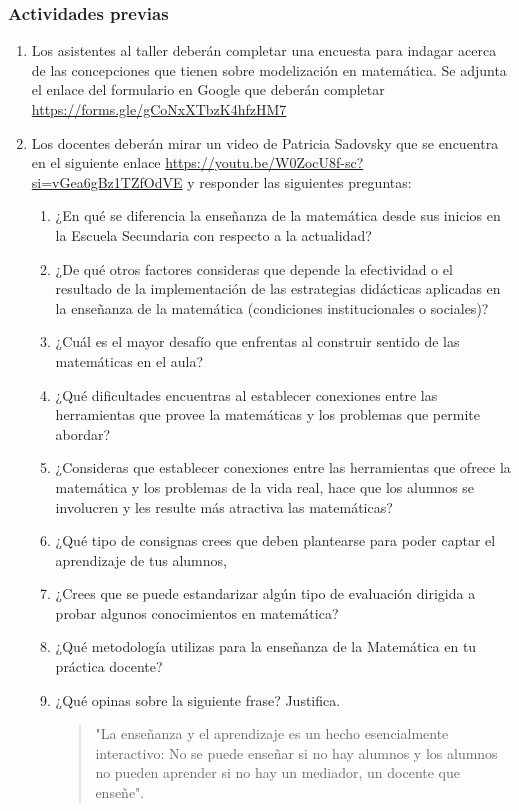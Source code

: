 \subsubsection{Actividades previas}
\begin{enumerate}
	\item Los asistentes al taller deberán completar una encuesta para indagar acerca de las concepciones que tienen sobre modelización en matemática. Se adjunta el enlace del formulario en Google que deberán completar \url{https://forms.gle/gCoNxXTbzK4hfzHM7}
	
	\item Los docentes deberán mirar un video de Patricia Sadovsky que se encuentra en el siguiente enlace \url{https://youtu.be/W0ZocU8f-sc?si=vGea6gBz1TZfOdVE} y responder las siguientes preguntas:
	
	\begin{enumerate}[2.1]
		\itshape
		\item ¿En qué se diferencia la enseñanza de la matemática desde sus inicios en la Escuela Secundaria con respecto a la actualidad?
		\item ¿De qué otros factores consideras que depende la efectividad o el resultado de la implementación de las estrategias didácticas aplicadas en la enseñanza de la matemática (condiciones institucionales o sociales)?
		\item ¿Cuál es el mayor desafío que enfrentas al construir sentido de las matemáticas en el aula?
		\item ¿Qué dificultades encuentras al establecer conexiones entre las herramientas que provee la matemáticas y los problemas que permite abordar?
		\item ¿Consideras que establecer conexiones entre las herramientas que ofrece la matemática y los problemas de la vida real, hace que los alumnos se involucren y les resulte más atractiva las matemáticas?
		\item ¿Qué tipo de consignas crees que deben plantearse para poder captar el aprendizaje de tus alumnos,
		\item ¿Crees que se puede estandarizar algún tipo de evaluación dirigida a probar algunos conocimientos en matemática?
		\item ¿Qué metodología utilizas para la enseñanza de la Matemática en tu práctica docente?
		\item ¿Qué opinas sobre la siguiente frase? Justifica.
		\begin{quote}
			"La enseñanza y el aprendizaje es un hecho esencialmente interactivo: No se puede enseñar si no hay alumnos y los alumnos no pueden aprender si no hay un mediador, un docente que enseñe".
		\end{quote}
	\end{enumerate}
\end{enumerate}

